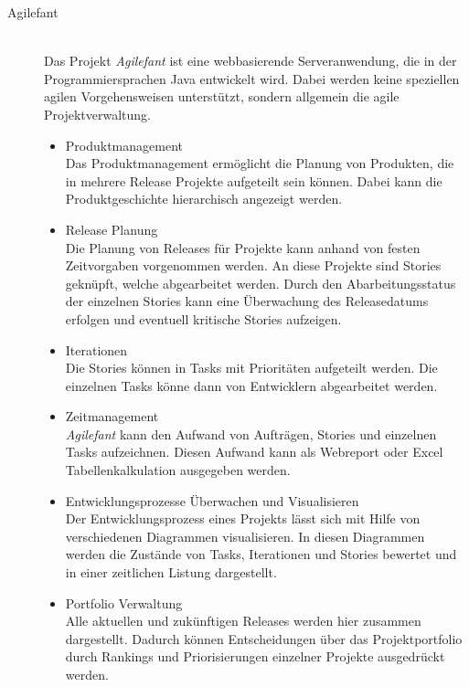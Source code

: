 \begin{description}
\item[Agilefant]\hspace*{1em}\\
Das Projekt \emph{Agilefant} ist eine webbasierende Serveranwendung, die in der Programmiersprachen Java entwickelt wird. Dabei werden keine speziellen agilen Vorgehensweisen unterstützt, sondern allgemein die agile Projektverwaltung.
\begin{itemize}
\item Produktmanagement\\
Das Produktmanagement ermöglicht die Planung von Produkten, die in mehrere Release Projekte aufgeteilt sein können. Dabei kann die Produktgeschichte hierarchisch angezeigt werden.
\item Release Planung\\
Die Planung von Releases für Projekte kann anhand von festen Zeitvorgaben vorgenommen werden. An diese Projekte sind Stories geknüpft, welche abgearbeitet werden. Durch den Abarbeitungsstatus der einzelnen Stories kann eine Überwachung des Releasedatums erfolgen und eventuell kritische Stories aufzeigen.
\item Iterationen\\
Die Stories können in Tasks mit Prioritäten aufgeteilt werden. Die einzelnen Tasks könne dann von Entwicklern abgearbeitet werden.
\item Zeitmanagement\\
\emph{Agilefant} kann den Aufwand von Aufträgen, Stories und einzelnen Tasks aufzeichnen. Diesen Aufwand kann als Webreport oder Excel Tabellenkalkulation ausgegeben werden.
\item Entwicklungsprozesse Überwachen und Visualisieren\\
Der Entwicklungsprozess eines Projekts lässt sich mit Hilfe von verschiedenen Diagrammen visualisieren. In diesen Diagrammen werden die Zustände von Tasks, Iterationen und Stories bewertet und in einer zeitlichen Listung dargestellt. 
\item Portfolio Verwaltung\\
Alle aktuellen und zukünftigen Releases werden hier zusammen dargestellt. Dadurch können Entscheidungen über das Projektportfolio durch Rankings und Priorisierungen einzelner Projekte ausgedrückt werden.
\end{itemize}


\end{description}
